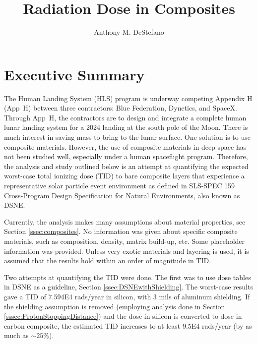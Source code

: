 \documentclass{hitec}
\title{Radiation Dose in Composites}
\author{Anthony M. DeStefano}
\begin{document}
\maketitle
{}

\tableofcontents
\listoffigures
\listoftables
\newpage






\cleardoublepage
{}
\section{Executive Summary}

The Human Landing System (HLS) program is underway competing Appendix H (App~H) between three contractors: Blue Federation, Dynetics, and SpaceX. Through App~H, the contractors are to design and integrate a complete human lunar landing system for a 2024 landing at the south pole of the Moon. There is much interest in saving mass to bring to the lunar surface. One solution is to use composite materials. However, the use of composite materials in deep space has not been studied well, especially under a human spaceflight program. Therefore, the analysis and study outlined below is an attempt at quantifying the expected worst-case total ionizing dose (TID) to bare composite layers that experience a representative solar particle event environment as defined in SLS-SPEC 159 Cross-Program Design Specification for Natural Environments, also known as DSNE.

Currently, the analysis makes many assumptions about material properties, see Section \ref{ssec:composites}. No information was given about specific composite materials, such as composition, density, matrix build-up, etc. Some placeholder information was provided. Unless very exotic materials and layering is used, it is assumed that the results hold within an order of magnitude in TID.

Two attempts at quantifying the TID were done. The first was to use dose tables in DSNE as a guideline, Section \ref{ssec:DSNEwithShielding}. The worst-case results gave a TID of 7.594E4 rads/year in silicon, with $3$ mils of aluminum shielding. If the shielding assumption is removed (employing analysis done in Section \ref{sssec:ProtonStoppingDistance}) and the dose in silicon is converted to dose in carbon composite, the estimated TID increases to at least 9.5E4 rads/year (by as much as $\sim 25\%$).
\end{document}
